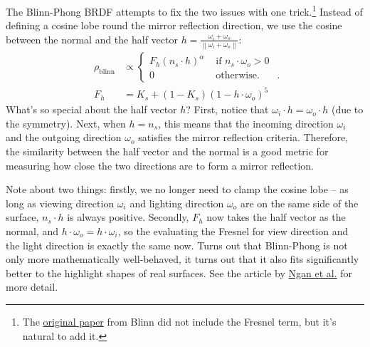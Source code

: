 The Blinn-Phong BRDF attempts to fix the two issues with one trick.\footnote{The \href{https://dl.acm.org/doi/10.1145/360349.360353}{original paper} from Blinn did not include the Fresnel term, but it's natural to add it.} 
Instead of defining a cosine lobe round the mirror reflection direction, we use the cosine between the normal and the half vector $h = \frac{\omega_i + \omega_o}{\left\|\omega_i + \omega_o\right\|}$:
\begin{equation}
\begin{aligned}
\rho_{\text{blinn}} &\propto \begin{cases}
F_h \left(n_s \cdot h\right)^{\alpha} & \text{ if } n_s \cdot \omega_o > 0 \\
0 & \text{ otherwise.} 
\end{cases} \\
F_h &= K_s + (1 - K_s) (1 - h \cdot \omega_o)^5
\label{eq:schilick_fresnel}
\end{aligned}.
\end{equation}
What's so special about the half vector $h$? First, notice that $\omega_i \cdot h = \omega_o \cdot h$ (due to the symmetry). Next, when $h = n_s$, this means that the incoming direction $\omega_i$ and the outgoing direction $\omega_o$ satisfies the mirror reflection criteria. Therefore, the similarity between the half vector and the normal is a good metric for measuring how close the two directions are to form a mirror reflection.

Note about two things: firstly, we no longer need to clamp the cosine lobe -- as long as viewing direction $\omega_i$ and lighting direction $\omega_o$ are on the same side of the surface, $n_s \cdot h$ is always positive. Secondly, $F_h$ now takes the half vector as the normal, and $h \cdot \omega_o = h \cdot \omega_i$, so the evaluating the Fresnel for view direction and the light direction is exactly the same now. 
Turns out that Blinn-Phong is not only more mathematically well-behaved, it turns out that it also fits significantly better to the highlight shapes of real surfaces. See the article by \href{http://people.csail.mit.edu/addy/research/brdf/index.html}{Ngan et al.} for more detail.

